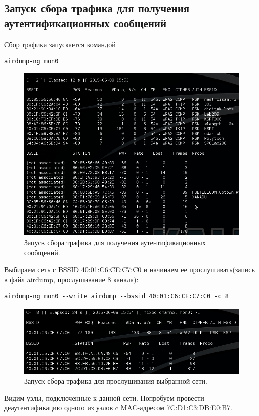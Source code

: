 \documentclass[a4paper, 14pt]{article}				%
\begin{document}
\subsection{Запуск сбора трафика для получения аутентификационных сообщений}
Сбор трафика запускается командой
\begin{Verbatim}[frame=single]
airdump-ng mon0
\end{Verbatim}

\begin{figure}[h!]
\centering
\includegraphics[width=\textwidth]{rsrc/lab6_airodump_start}
\caption{Запуск сбора трафика для получения аутентификационных сообщений.}
\end{figure}

\newpage
Выбираем сеть с BSSID 40:01:C6:CE:C7:C0 и начинаем ее прослушивать(запись в файл airdump, прослушивание 8 канала):
\begin{Verbatim}[frame=single]
airdump-ng mon0 --write airdump --bssid 40:01:C6:CE:C7:C0 -c 8
\end{Verbatim}

\begin{figure}[h!]
\centering
\includegraphics[width=\textwidth]{rsrc/lab6_airodump_bssid}
\caption{Запуск сбора трафика для прослушивания выбранной сети.}
\end{figure}
Видим узлы, подключенные к данной сети. Попробуем провести деаутентификацию одного из узлов c MAC-адресом 7C:D1:C3:DB:E0:B7.
\end{document}
